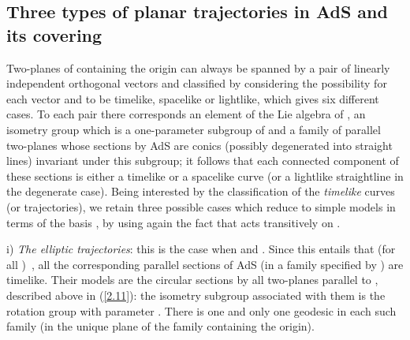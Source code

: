 \documentclass[a4paper,a4paper]{article}
\def\amb{E_{d+1}}
\begin{document}
\subsection{Three types of planar trajectories in AdS and its covering}

Two-planes of \myHighlight{$\amb$}\coordHE{} containing the origin
can always be spanned by a pair of linearly independent orthogonal
vectors \coordHE{} and classified by considering
the possibility for each vector \coordHE{} and \coordHE{}
to be timelike, spacelike or lightlike,
which gives six different cases. To each pair \coordHE{} there corresponds
an element \coordHE{} of the Lie algebra of \coordHE{},
an isometry group \coordHE{} which is a one-parameter subgroup of \coordHE{} and
a family of parallel two-planes whose sections by AdS are conics
(possibly degenerated into straight lines)
invariant under this subgroup; it follows that each connected
component of these sections is either a timelike or a spacelike
curve (or a lightlike straightline in the degenerate case).
Being interested by the classification of the {\sl timelike} curves
(or trajectories), we retain three possible cases which
reduce to simple models in terms of the basis \coordHE{},
by using again the fact that \coordHE{} acts transitively on \coordHE{}.


\vskip 0.2cm
i) {\sl The elliptic trajectories}:
this is the case when \coordHE{} and \coordHE{}. Since
this entails that (for all \myHighlight{$\alpha,\beta$}\coordHE{})\
\coordHE{}, all the corresponding
parallel sections of AdS (in a family specified by \myHighlight{$(a,b)$}\coordHE{})
are timelike. Their models are the circular sections by all two-planes
parallel to \myHighlight{$(e_0,e_d)$}\coordHE{}, described above in
(\ref{2.11}): the isometry subgroup associated with them is the
rotation group with parameter \coordHE{}.
There is one and only one geodesic in each such family
(in the unique plane of the family containing the origin).
\end{document}
